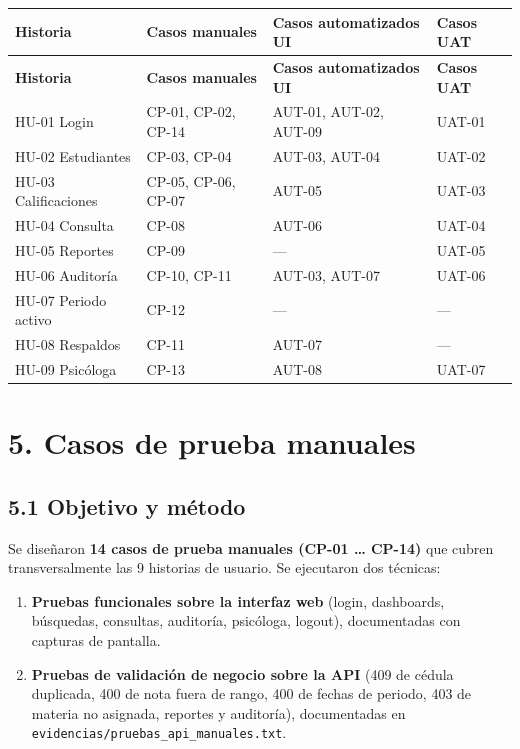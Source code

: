 \documentclass[11pt,a4paper]{article}
\begin{document}
{\small
\begin{longtable}{|p{}|p{}|p{}|p{}|}
\rowcolor{UTECblue}\color{white}\bfseries Historia & \color{white}\bfseries Casos manuales & \color{white}\bfseries Casos automatizados UI & \color{white}\bfseries Casos UAT \\ \hline
\endfirsthead
\rowcolor{UTECblue}\color{white}\bfseries Historia & \color{white}\bfseries Casos manuales & \color{white}\bfseries Casos automatizados UI & \color{white}\bfseries Casos UAT \\ \hline
\endhead
HU-01 Login & CP-01, CP-02, CP-14 & AUT-01, AUT-02, AUT-09 & UAT-01 \\ \hline
HU-02 Estudiantes & CP-03, CP-04 & AUT-03, AUT-04 & UAT-02 \\ \hline
HU-03 Calificaciones & CP-05, CP-06, CP-07 & AUT-05 & UAT-03 \\ \hline
HU-04 Consulta & CP-08 & AUT-06 & UAT-04 \\ \hline
HU-05 Reportes & CP-09 & --- & UAT-05 \\ \hline
HU-06 Auditoría & CP-10, CP-11 & AUT-03, AUT-07 & UAT-06 \\ \hline
HU-07 Periodo activo & CP-12 & --- & --- \\ \hline
HU-08 Respaldos & CP-11 & AUT-07 & --- \\ \hline
HU-09 Psicóloga & CP-13 & AUT-08 & UAT-07 \\ \hline
\end{longtable}}


\section*{5. Casos de prueba manuales}


\subsection*{5.1 Objetivo y método}


Se diseñaron \textbf{14 casos de prueba manuales (CP-01 {\ldots} CP-14)} que cubren transversalmente las 9 historias de usuario. Se ejecutaron dos técnicas:


\begin{enumerate}[leftmargin=*]
\item \textbf{Pruebas funcionales sobre la interfaz web} (login, dashboards, búsquedas, consultas, auditoría, psicóloga, logout), documentadas con capturas de pantalla.
\item \textbf{Pruebas de validación de negocio sobre la API} (409 de cédula duplicada, 400 de nota fuera de rango, 400 de fechas de periodo, 403 de materia no asignada, reportes y auditoría), documentadas en \texttt{evidencias/pruebas\_api\_manuales.txt}.
\end{enumerate}
\end{document}
